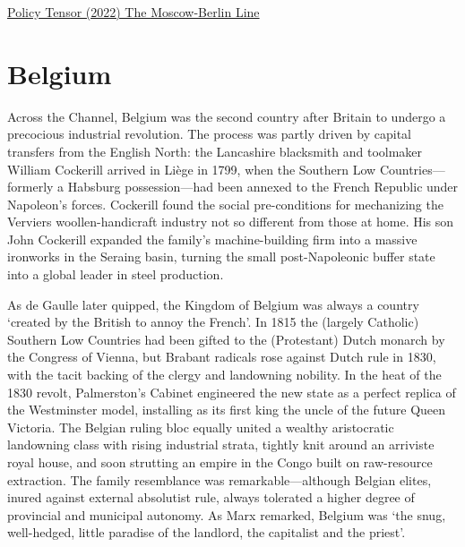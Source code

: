 \documentclass[
]{book}
\begin{document}
\href{https://policytensor.substack.com/p/the-moscow-berlin-line}{Policy Tensor (2022) The Moscow-Berlin Line}

\hypertarget{belgium}{%
\chapter{Belgium}\label{belgium}}

Across the Channel, Belgium was the second country after Britain to undergo a precocious industrial revolution. The process was partly driven by capital transfers from the English North: the Lancashire blacksmith and toolmaker William Cockerill arrived in Liège in 1799, when the Southern Low Countries---formerly a Habsburg possession---had been annexed to the French Republic under Napoleon's forces. Cockerill found the social pre-conditions for mechanizing the Verviers woollen-handicraft industry not so different from those at home. His son John Cockerill expanded the family's machine-building firm into a massive ironworks in the Seraing basin, turning the small post-Napoleonic buffer state into a global leader in steel production.

As de Gaulle later quipped, the Kingdom of Belgium was always a country `created by the British to annoy the French'. In 1815 the (largely Catholic) Southern Low Countries had been gifted to the (Protestant) Dutch monarch by the Congress of Vienna, but Brabant radicals rose against Dutch rule in 1830, with the tacit backing of the clergy and landowning nobility. In the heat of the 1830 revolt, Palmerston's Cabinet engineered the new state as a perfect replica of the Westminster model, installing as its first king the uncle of the future Queen Victoria. The Belgian ruling bloc equally united a wealthy aristocratic landowning class with rising industrial strata, tightly knit around an arriviste royal house, and soon strutting an empire in the Congo built on raw-resource extraction. The family resemblance was remarkable---although Belgian elites, inured against external absolutist rule, always tolerated a higher degree of provincial and municipal autonomy. As Marx remarked, Belgium was `the snug, well-hedged, little paradise of the landlord, the capitalist and the priest'.
\end{document}
